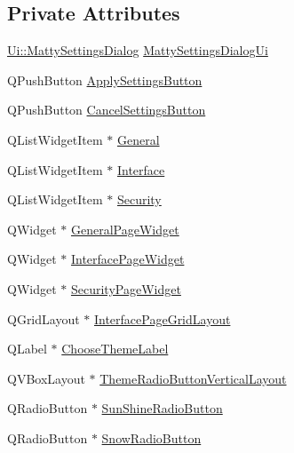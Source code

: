 \subsection*{Private Attributes}
\begin{DoxyCompactItemize}
\item 
\hyperlink{classUi_1_1MattySettingsDialog}{Ui\+::\+Matty\+Settings\+Dialog} \hyperlink{classMattySettingsDialog_a9624c1cd6a36fd847717294aa124b9d3}{Matty\+Settings\+Dialog\+Ui}
\item 
Q\+Push\+Button \hyperlink{classMattySettingsDialog_a60e2fb3f6bc9332d9d567132d05d181e}{Apply\+Settings\+Button}
\item 
Q\+Push\+Button \hyperlink{classMattySettingsDialog_a95c3a91578fb2dd6e823d883bc21b87a}{Cancel\+Settings\+Button}
\item 
Q\+List\+Widget\+Item $\ast$ \hyperlink{classMattySettingsDialog_a5f12126027ce73f0e7e554322d8a46c9}{General}
\item 
Q\+List\+Widget\+Item $\ast$ \hyperlink{classMattySettingsDialog_aa507ec4d06a64cbc2f6748c67ff0df1e}{Interface}
\item 
Q\+List\+Widget\+Item $\ast$ \hyperlink{classMattySettingsDialog_a1f96950ec3adabcad3a25926649c739b}{Security}
\item 
Q\+Widget $\ast$ \hyperlink{classMattySettingsDialog_af9ea43e4ed86bbcce00c3e33ba360455}{General\+Page\+Widget}
\item 
Q\+Widget $\ast$ \hyperlink{classMattySettingsDialog_aa5207929e832b669595789eb430320cb}{Interface\+Page\+Widget}
\item 
Q\+Widget $\ast$ \hyperlink{classMattySettingsDialog_a73e2049874e44a3ef9249942fe276be5}{Security\+Page\+Widget}
\item 
Q\+Grid\+Layout $\ast$ \hyperlink{classMattySettingsDialog_ad2b26a023e7e9541c34c4e1aba800a8e}{Interface\+Page\+Grid\+Layout}
\item 
Q\+Label $\ast$ \hyperlink{classMattySettingsDialog_acd28094d640ba4cca05c8b23e00b3a59}{Choose\+Theme\+Label}
\item 
Q\+V\+Box\+Layout $\ast$ \hyperlink{classMattySettingsDialog_a2b7a07510ef76c1161d247437e0a39c0}{Theme\+Radio\+Button\+Vertical\+Layout}
\item 
Q\+Radio\+Button $\ast$ \hyperlink{classMattySettingsDialog_a58a1d3e1f6837337e641854d89e08317}{Sun\+Shine\+Radio\+Button}
\item 
Q\+Radio\+Button $\ast$ \hyperlink{classMattySettingsDialog_a0311fa433fe036e18ea683a4f256098b}{Snow\+Radio\+Button}
\item 

\end{DoxyCompactItemize}
